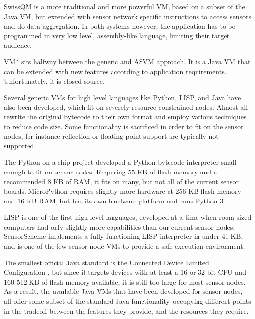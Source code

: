 SwissQM \cite{Muller:2007fs} is a more traditional and more powerful VM, based on a subset of the Java VM, but extended with sensor network specific instructions to access sensors and do data aggregation. In both systems however, the application has to be programmed in very low level, assembly-like language, limiting their target audience.

VM* \cite{Koshy:2005ww} sits halfway between the generic and ASVM approach. It is a Java VM that can be extended with new features according to application requirements. Unfortunately, it is closed source.

Several generic VMs for high level languages like Python, LISP, and Java have also been developed, which fit on severely resource-constrained nodes. Almost all rewrite the original bytecode to their own format and employ various techniques to reduce code size. Some functionality is sacrificed in order to fit on the sensor nodes, for instance reflection or floating point support are typically not supported.

The Python-on-a-chip project \cite{python-on-a-chip} developed a Python bytecode interpreter small enough to fit on sensor nodes. Requiring 55 KB of flash memory and a recommended 8 KB of RAM, it fits on many, but not all of the current sensor boards. MicroPython \cite{micropython} requires slightly more hardware at 256 KB flash memory and 16 KB RAM, but has its own hardware platform and runs Python 3.

LISP is one of the first high-level languages, developed at a time when room-sized computers had only slightly more capabilities than our current sensor nodes. SensorScheme \cite{Evers:2010ur} implements a fully functioning LISP interpreter in under 41 KB, and is one of the few sensor node VMs to provide a safe execution environment.


The smallest official Java standard is the Connected Device Limited Configuration \cite{CLDC}, but since it targets devices with at least a 16 or 32-bit CPU and 160-512 KB of flash memory available, it is still too large for most sensor nodes. As a result, the available Java VMs that have been developed for sensor nodes, all offer some subset of the standard Java functionality, occupying different points in the tradeoff between the features they provide, and the resources they require.

